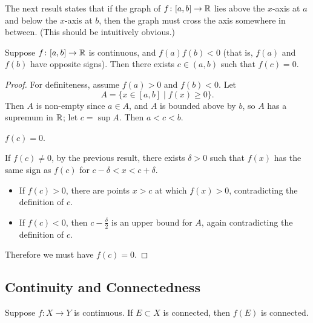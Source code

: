 The next result states that if the graph of $f\colon [a,b]\to\mathbb R$ lies above the $x$-axis at $a$ and below the $x$-axis at $b$, then the graph must cross the axis somewhere in between. (This should be intuitively obvious.)

\begin{theorem}[Bolzano]
Suppose $f\colon [a,b]\to\mathbb R$ is continuous, and $f(a)f(b)<0$ (that is, $f(a)$ and $f(b)$ have opposite signs). Then there exists $c\in(a,b)$ such that $f(c)=0$.
\end{theorem}

\begin{proof}
For definiteness, assume $f(a)>0$ and $f(b)<0$. Let
\[A=\{x\in[a,b]\mid f(x)\ge0\}.\]
Then $A$ is non-empty since $a\in A$, and $A$ is bounded above by $b$, so $A$ has a supremum in $\mathbb R$; let $c=\sup A$. Then $a<c<b$.
\begin{claim}
$f(c)=0$.
\end{claim}
If $f(c)\neq0$, by the previous result, there exists $\delta>0$ such that $f(x)$ has the same sign as $f(c)$ for $c-\delta<x<c+\delta$.
\begin{itemize}
\item If $f(c)>0$, there are points $x>c$ at which $f(x)>0$, contradicting the definition of $c$.
\item If $f(c)<0$, then $c-\frac{\delta}{2}$ is an upper bound for $A$, again contradicting the definition of $c$.
\end{itemize}
Therefore we must have $f(c)=0$.
\end{proof}
\pagebreak

\subsection{Continuity and Connectedness}
\begin{proposition}
Suppose $f\colon X\to Y$ is continuous. If $E\subset X$ is connected, then $f(E)$ is connected.
\end{proposition}

